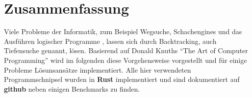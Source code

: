 \chapter*{Zusammenfassung}

Viele Probleme der Informatik, zum Beispiel Wegsuche, Schachengines und 
das Ausführen logischer Programme \cite[p. ~19]{DBLP:journals/jlp/SomogyiHC96}, lassen sich durch Backtracking, auch Tiefensuche genannt, lösen.
Basierend auf Donald Knuths "`The Art of Computer Programming"'\cite{TAOCP} wird im folgenden diese Vorgehensweise 
vorgestellt und für einige Probleme Lösunsansätze implementiert. Alle hier verwendeten Programmschnipsel wurden in \textbf{Rust} implementiert und sind
dokumentiert auf \textbf{github}\cite{Kauschke} neben einigen Benchmarks zu finden.
